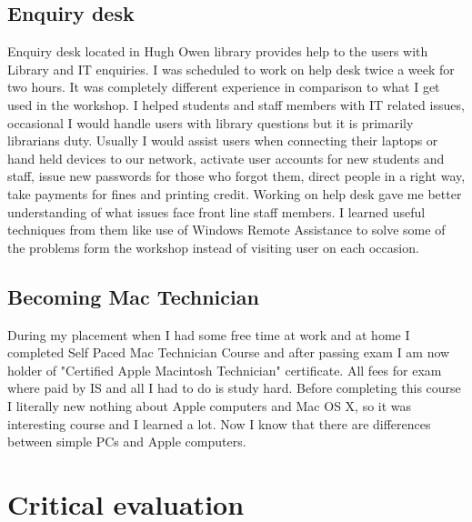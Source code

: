 \documentclass[10pt,a4paper,headinclude=true]{report}
\begin{document}
\section{Enquiry desk}
Enquiry desk located in Hugh Owen library provides help to the users with Library and IT enquiries. I was scheduled to work on help desk twice a week for two hours. It was completely different experience in comparison to what I get used in the workshop. I helped students and staff members with IT related issues, occasional I would handle users with library  questions but it is primarily librarians duty. Usually I would assist users when connecting their laptops or hand held devices to our network, activate user accounts for new students and staff, issue new passwords for those who forgot them, direct people in a right way, take payments for fines and printing credit. Working on help desk gave me better understanding of what issues face front line staff members. I learned useful techniques from them like use of Windows Remote Assistance to solve some of the problems form the workshop instead of visiting user on each occasion.
  
\section{Becoming Mac Technician}
During my placement when I had some free time at work and at home I completed Self Paced Mac Technician Course and after passing exam I am now holder of "Certified Apple Macintosh Technician" certificate. All fees for exam where paid by IS and all I had to do is study hard. Before completing this course I literally new nothing about Apple computers and Mac OS X, so it was interesting course and I learned a lot. Now I know that there are differences between simple PCs and Apple computers. 
\chapter{Critical evaluation}



\end{document}
